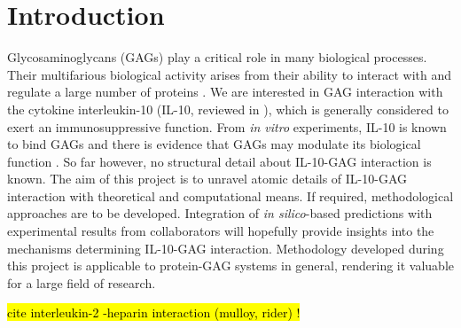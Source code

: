 \chapter{Introduction}

Glycosaminoglycans (GAGs) play a critical role in many biological processes.
Their multifarious biological activity arises from their ability to interact
with and regulate a large number of proteins \cite{handel_2005}. We are
interested in GAG interaction with the cytokine interleukin-10 (IL-10, reviewed
in \cite{moore_2001}), which is generally considered to exert an
immunosuppressive function. From \textit{in vitro} experiments, IL-10 is known
to bind GAGs and there is evidence that GAGs may modulate its biological
function \cite{salek_ardakani_2000}. So far however, no structural detail about
IL-10-GAG interaction is known. The aim of this project is to unravel atomic
details of IL-10-GAG interaction with theoretical and computational means. If
required, methodological approaches are to be developed. Integration of
\textit{in silico}-based predictions with experimental results from
collaborators will hopefully provide insights into the mechanisms determining
IL-10-GAG interaction. Methodology developed during this project is applicable
to protein-GAG systems in general, rendering it valuable for a large field of
research.


\hl{cite interleukin-2 -heparin interaction (mulloy, rider) !}

\lipsum[1-10]